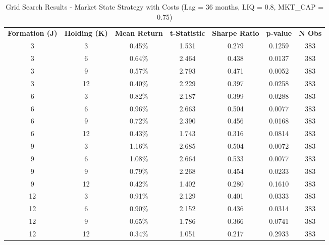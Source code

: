 \begin{table}[htbp]
\caption{Grid Search Results - Market State Strategy with Costs (Lag = 36 months, LIQ = 0.8, MKT\_CAP = 0.75)}
\label{tab:grid_search_costs_lag36}
\begin{tabular}{cc|ccccc}
\hline
\textbf{Formation (J)} & \textbf{Holding (K)} & \textbf{Mean Return} & \textbf{t-Statistic} & \textbf{Sharpe Ratio} & \textbf{p-value} & \textbf{N Obs} \\
\cline{3-7}
3 & 3 & 0.45\% & 1.531 & 0.279 & 0.1259 & 383 \\
3 & 6 & 0.64\% & 2.464 & 0.438 & 0.0137 & 383 \\
3 & 9 & 0.57\% & 2.793 & 0.471 & 0.0052 & 383 \\
3 & 12 & 0.40\% & 2.229 & 0.397 & 0.0258 & 383 \\
6 & 3 & 0.82\% & 2.187 & 0.399 & 0.0288 & 383 \\
6 & 6 & 0.96\% & 2.663 & 0.504 & 0.0077 & 383 \\
6 & 9 & 0.72\% & 2.390 & 0.456 & 0.0168 & 383 \\
6 & 12 & 0.43\% & 1.743 & 0.316 & 0.0814 & 383 \\
9 & 3 & 1.16\% & 2.685 & 0.504 & 0.0072 & 383 \\
9 & 6 & 1.08\% & 2.664 & 0.533 & 0.0077 & 383 \\
9 & 9 & 0.79\% & 2.268 & 0.454 & 0.0233 & 383 \\
9 & 12 & 0.42\% & 1.402 & 0.280 & 0.1610 & 383 \\
12 & 3 & 0.91\% & 2.129 & 0.401 & 0.0333 & 383 \\
12 & 6 & 0.90\% & 2.152 & 0.436 & 0.0314 & 383 \\
12 & 9 & 0.65\% & 1.786 & 0.366 & 0.0741 & 383 \\
12 & 12 & 0.34\% & 1.051 & 0.217 & 0.2933 & 383 \\
\hline
\end{tabular}
\end{table}
